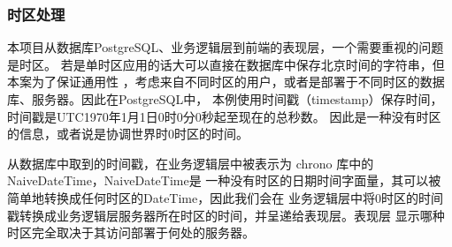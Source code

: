 \subsubsection{时区处理}
本项目从数据库PostgreSQL、业务逻辑层到前端的表现层，一个需要重视的问题是时区。
若是单时区应用的话大可以直接在数据库中保存北京时间的字符串，但本案为了保证通用性
，考虑来自不同时区的用户，或者是部署于不同时区的数据库、服务器。因此在PostgreSQL中，
本例使用时间戳（timestamp）保存时间，时间戳是UTC1970年1月1日0时0分0秒起至现在的总秒数。
因此是一种没有时区的信息，或者说是协调世界时0时区的时间。

从数据库中取到的时间戳，在业务逻辑层中被表示为 chrono 库中的 NaiveDateTime，NaiveDateTime是
一种没有时区的日期时间字面量，其可以被简单地转换成任何时区的DateTime，因此我们会在
业务逻辑层中将0时区的时间戳转换成业务逻辑层服务器所在时区的时间，并呈递给表现层。表现层
显示哪种时区完全取决于其访问部署于何处的服务器。

